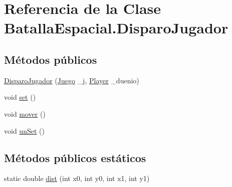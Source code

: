 \hypertarget{classBatallaEspacial_1_1DisparoJugador}{
\section{Referencia de la Clase BatallaEspacial.DisparoJugador}
\label{classBatallaEspacial_1_1DisparoJugador}
}
\subsection*{Métodos públicos}
\begin{DoxyCompactItemize}
\item 
\hyperlink{classBatallaEspacial_1_1DisparoJugador_aa61493d90cfc993d0e920f0b79ec19b6}{DisparoJugador} (\hyperlink{classBatallaEspacial_1_1Juego}{Juego} \_\-j, \hyperlink{classBatallaEspacial_1_1Player}{Player} \_\-duenio)
\item 
void \hyperlink{classBatallaEspacial_1_1DisparoJugador_a2f6c4ed697f5c461c03d5f4eb3d14034}{set} ()
\item 
void \hyperlink{classBatallaEspacial_1_1DisparoJugador_a6e5645b615991b96ee61e8d1c5a4a8cd}{mover} ()
\item 
void \hyperlink{classBatallaEspacial_1_1DisparoJugador_ab46d7377b7072574918df5222076e141}{unSet} ()
\end{DoxyCompactItemize}
\subsection*{Métodos públicos estáticos}
\begin{DoxyCompactItemize}
\item 
static double \hyperlink{classBatallaEspacial_1_1DisparoJugador_a12cb891b8f12d8ab631c7ab0d98002db}{dist} (int x0, int y0, int x1, int y1)
\end{DoxyCompactItemize}
